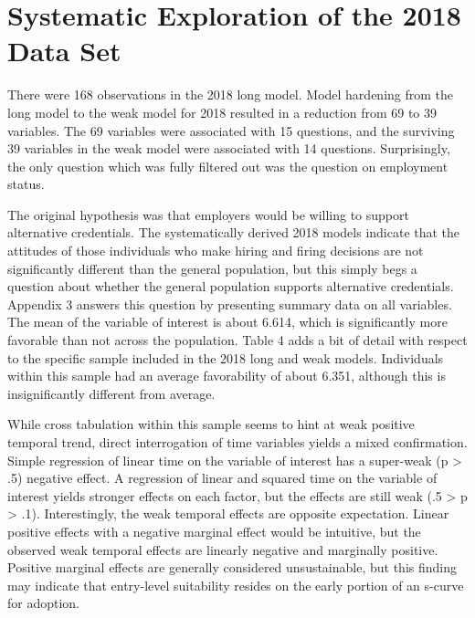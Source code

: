 \documentclass[AER]{/Users/zyl357/Documents/GitHub/research-dissertation-case-for-alt-ed/papers/alt-ed-survey/aea-latex-templates/AEA}
\begin{document}

\section{Systematic Exploration of the 2018 Data Set}

There were 168 observations in the 2018 long model. Model hardening from
the long model to the weak model for 2018 resulted in a reduction from 69
to 39 variables. The 69 variables were associated with 15 questions, and
the surviving 39 variables in the weak model were associated with 14
questions. Surprisingly, the only question which was fully filtered out
was the question on employment status.

The original hypothesis was that employers would be willing to support
alternative credentials. The systematically derived 2018 models indicate
that the attitudes of those individuals who make hiring and firing
decisions are not significantly different than the general population, but
this simply begs a question about whether the general population supports
alternative credentials. Appendix 3 answers this question by presenting
summary data on all variables. The mean of the variable of interest is
about 6.614, which is significantly more favorable than not across the
population. Table 4 adds a bit of detail with respect to the specific
sample included in the 2018 long and weak models. Individuals within this
sample had an average favorability of about 6.351, although this is
insignificantly different from average.


While cross tabulation within this sample seems to hint at weak positive
temporal trend, direct interrogation of time variables yields a mixed
confirmation. Simple regression of linear time on the variable of interest
has a super-weak (p > .5) negative effect. A regression of linear and
squared time on the variable of interest yields stronger effects on each
factor, but the effects are still weak (.5 > p > .1). Interestingly,
the weak temporal effects are opposite expectation. Linear positive
effects with a negative marginal effect would be intuitive, but the
observed weak temporal effects are linearly negative and marginally
positive. Positive marginal effects are generally considered
unsustainable, but this finding may indicate that entry-level suitability
resides on the early portion of an s-curve for adoption.
\end{document}
